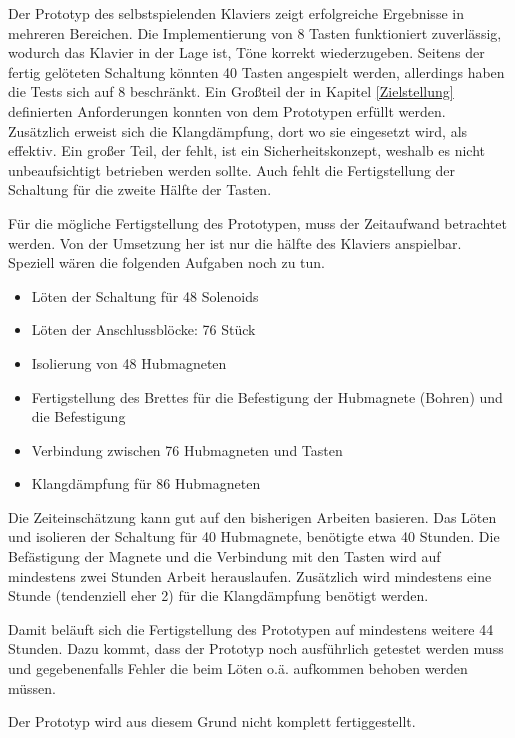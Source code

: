 Der Prototyp des selbstspielenden Klaviers zeigt erfolgreiche Ergebnisse in mehreren Bereichen. Die Implementierung von
8 Tasten funktioniert zuverlässig, wodurch das Klavier in der Lage ist, Töne korrekt wiederzugeben. Seitens der
fertig gelöteten Schaltung könnten 40 Tasten angespielt werden, allerdings haben die Tests sich auf 8 beschränkt.
Ein Großteil der in Kapitel \ref{Zielstellung} definierten Anforderungen konnten von dem Prototypen erfüllt werden.
Zusätzlich erweist sich die Klangdämpfung, dort wo sie eingesetzt wird, als effektiv. \newline
Ein großer Teil, der fehlt, ist ein Sicherheitskonzept, weshalb es nicht unbeaufsichtigt betrieben
werden sollte.
Auch fehlt die Fertigstellung der Schaltung für die zweite Hälfte der Tasten.

Für die mögliche Fertigstellung des Prototypen, muss der Zeitaufwand betrachtet werden.
Von der Umsetzung her ist nur die hälfte des Klaviers anspielbar. Speziell wären die folgenden Aufgaben noch zu tun.
\begin{itemize}
    \item Löten der Schaltung für 48 Solenoids
    \item Löten der Anschlussblöcke: 76 Stück
    \item Isolierung von 48 Hubmagneten
    \item Fertigstellung des Brettes für die Befestigung der Hubmagnete (Bohren) und die Befestigung %
    \item Verbindung zwischen 76 Hubmagneten und Tasten
    \item Klangdämpfung für 86 Hubmagneten
\end{itemize}

Die Zeiteinschätzung kann gut auf den bisherigen Arbeiten basieren. Das Löten und isolieren der Schaltung für
40 Hubmagnete, benötigte etwa 40 Stunden. Die Befästigung der Magnete und die Verbindung mit den Tasten wird auf
mindestens zwei Stunden Arbeit herauslaufen.
Zusätzlich wird mindestens eine Stunde (tendenziell eher 2) für die Klangdämpfung benötigt werden.

Damit beläuft sich die Fertigstellung des Prototypen auf mindestens weitere 44 Stunden. Dazu kommt, dass der Prototyp
noch ausführlich getestet werden muss und gegebenenfalls Fehler die beim Löten o.ä. aufkommen behoben werden müssen.

Der Prototyp wird aus diesem Grund nicht komplett fertiggestellt.

